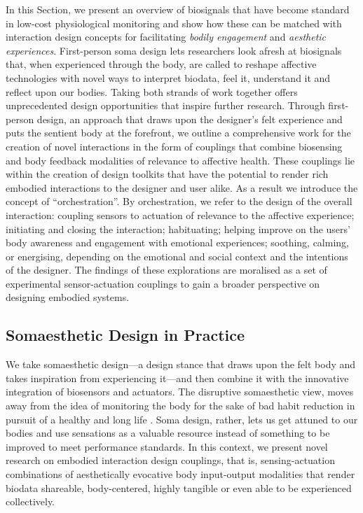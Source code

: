 In this Section, we present an overview of biosignals that have become standard in low-cost physiological monitoring and show how these can be matched with interaction design concepts for facilitating \textit{bodily engagement} and \textit{aesthetic experiences}. First-person soma design lets researchers look afresh at biosignals that, when experienced through the body, are called to reshape affective technologies with novel ways to interpret biodata, feel it, understand it and reflect upon our bodies. Taking both strands of work together offers unprecedented design opportunities that inspire further research. Through first-person design, an approach that draws upon the designer’s felt experience and puts the sentient body at the forefront, we outline a comprehensive work for the creation of novel interactions in the form of couplings that combine biosensing and body feedback modalities of relevance to affective health. These couplings lie within the creation of design toolkits that have the potential to render rich embodied interactions to the designer and user alike. As a result we introduce the concept of “orchestration”. By orchestration, we refer to the design of the overall interaction: coupling sensors to actuation of relevance to the affective experience; initiating and closing the interaction; habituating; helping improve on the users’ body awareness and engagement with emotional experiences; soothing, calming, or energising, depending on the emotional and social context and the intentions of the designer. The findings of these explorations are moralised as a set of experimental sensor-actuation couplings to gain a broader perspective on designing embodied systems.

\subsection{Somaesthetic Design in Practice}

We take somaesthetic design—a design stance that draws upon the felt body and takes inspiration from experiencing it—and then combine it with the innovative integration of biosensors and actuators. The disruptive somaesthetic view, moves away from the idea of monitoring the body for the sake of bad habit reduction in pursuit of a healthy and long life \cite{hook_somaesthetic_2015}. Soma design, rather, lets us get attuned to our bodies and use sensations as a valuable resource instead of something to be improved to meet performance standards. In this context, we present novel research on embodied interaction design couplings, that is, sensing-actuation combinations of aesthetically evocative body input-output modalities that render biodata shareable, body-centered, highly tangible or even able to be experienced collectively.

